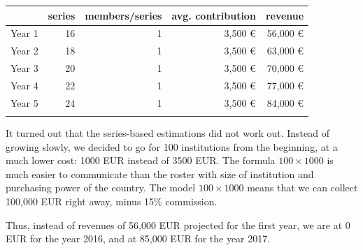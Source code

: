 \documentclass[nonflat,smallfont
]{langsci/langscibook}
\newcommand{\evaluation}[1]{
  \renewcommand{\tblslinecolour}{lsLightOrange}
  \tblssy{receipt}{Evaluation}{\vspace*{-5mm}#1}
}
\renewcommand{\tblssy}[4][black!12]{%
  \renewcommand{\langscisymbol}{#2}\renewcommand{\tblsboxcolor}{#1}
  \begin{mdframed}[style=yellowexercise,frametitle={#3}]
    #4
  \end{mdframed}
}
\begin{document}
{\noindent
\begin{tabularx}{\textwidth}{Xrrrr}
\lsptoprule
        &  series&  members/series&       avg. contribution &     revenue\\
\midrule
Year 1 &  16               &       1                                    &        3,500 €                                               &     56,000 €                                     \\
Year 2 &  18               &       1                                    &        3,500 €                                               &     63,000 €                                     \\
Year 3 &  20               &       1                                    &        3,500 €                                               &     70,000 €                                     \\
Year 4 &  22               &       1                                    &        3,500 €                                               &     77,000 €                                     \\
Year 5 &  24               &       1                                    &        3,500 €                                               &     84,000 €                                     \\
\lspbottomrule
\end{tabularx}
}
\evaluation{
It turned out that the series-based estimations did not work out. Instead of growing slowly, we decided to go for 100 institutions from the beginning, at a much lower cost: 1000 EUR instead of 3500 EUR. The formula $100 \times 1000$ is much easier to communicate than the roster with size of institution and purchasing power of the country. The model $100 \times 1000$ means that we can collect 100,000 EUR right away, minus 15\% commission. 

Thus, instead of revenues of 56,000 EUR projected for the first year, we are at 0 EUR for the year 2016, and at 85,000 EUR for the year 2017. 
}

\newpage 
\end{document}

